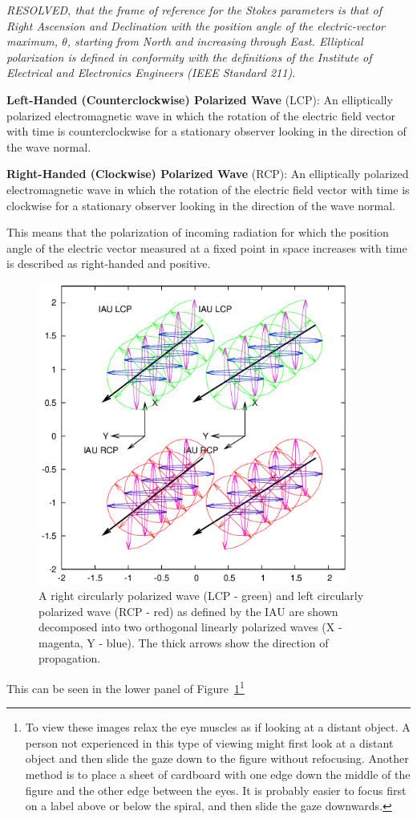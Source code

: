 \documentclass[letterpaper,11pt]{book}
\begin{document}
{\itshape RESOLVED, that the frame of reference for the Stokes parameters is
that of Right Ascension and Declination with the position angle of the
electric-vector maximum, $\theta$, starting from North and increasing through
East. Elliptical polarization is defined in conformity with the definitions of
the Institute of Electrical and Electronics Engineers
(IEEE Standard 211)}\cite{IEEE1969}.

{\bfseries Left-Handed (Counterclockwise) Polarized Wave} (LCP):
An elliptically polarized electromagnetic wave in which the
rotation of the electric field vector with time is
counterclockwise for a stationary observer looking in the
direction of the wave normal.

{\bfseries Right-Handed (Clockwise) Polarized Wave} (RCP): 
An elliptically polarized electromagnetic wave in which the
rotation of the electric field vector with time is clockwise
for a stationary observer looking in the direction of the wave
normal.

This means that the polarization of incoming radiation for which the position
angle of the electric vector measured at a fixed point in space
increases with time is described as right-handed and positive.
\begin{figure}[h!tb]
\begin{center}
\includegraphics[width=4in]{circular.png}
\caption[Circular Polarization]
{\label{fig:circ_pol} A right circularly polarized wave (LCP - green) and left
circularly polarized wave (RCP - red)
as defined by the IAU are shown decomposed into two
orthogonal linearly polarized waves (X - magenta, Y - blue). The thick arrows
show the direction of propagation.}
\end{center}
\end{figure}
This can be seen in the lower panel of Figure~\ref{fig:circ_pol}\footnote{To 
view these images relax the eye muscles as if
looking at a distant object. A person not experienced in this
type of viewing might first look at a distant object and then
slide the gaze down to the figure without refocusing. Another
method is to place a sheet of cardboard with one edge down the
middle of the figure and the other edge between the eyes. It is
probably easier to focus first on a label above or below
the spiral, and then slide the gaze downwards.}
\end{document}

